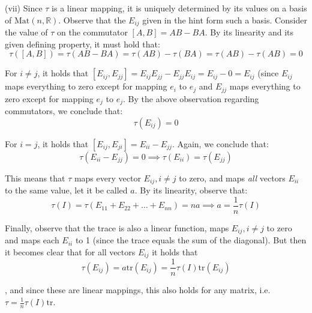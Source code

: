 \begin{solution}
    (vii) Since $\tau$ is a linear mapping, it is uniquely determined by its values on a basis of $\text{Mat}(n, \mathbb{R})$. Observe that the $E_{ij}$ given in the hint form such a basis. Consider the value of $\tau$ on the commutator $[A, B] = AB - BA$. By its linearity and its given defining property, it must hold that:
    $$\tau([A, B]) = \tau(AB-BA) = \tau(AB) - \tau(BA) = \tau(AB) - \tau(AB) = 0$$

    For $i \neq j$, it holds that $[E_{ij}, E_{jj}] = E_{ij}E_{jj} - E_{jj}E_{ij} = E_{ij} - 0 = E_{ij}$ (since $E_{ij}$ maps everything to zero except for mapping $e_i$ to $e_j$ and $E_{jj}$ maps everything to zero except for mapping $e_j$ to $e_j$. By the above observation regarding commutators, we conclude that:
    $$\tau(E_{ij}) = 0$$

    For $i = j$, it holds that $[E_{ij}, E_{ji}] = E_{ii} - E_{jj}$. Again, we conclude that:
    $$\tau(E_{ii} - E_{jj}) = 0 \implies \tau(E_{ii}) = \tau(E_{jj})$$

    This means that $\tau$ maps every vector $E_{ij}, i \neq j$ to zero, and maps \textit{all} vectors $E_{ii}$ to the same value, let it be called $a$. By its linearity, observe that:
    $$\tau(I) = \tau(E_{11}+E_{22} + \ldots + E_{nn}) = na \implies a = \frac{1}{n}\tau(I)$$

    Finally, observe that the trace is also a linear function, maps $E_{ij}, i \neq j$ to zero and maps each $E_{ii}$ to 1 (since the trace equals the sum of the diagonal). But then it becomes clear that for all vectors $E_{ij}$ it holds that 
    $$\tau(E_{ij}) = a \text{tr}(E_{ij}) = \frac{1}{n}\tau(I)\text{tr}(E_{ij})$$

    , and since these are linear mappings, this also holds for any matrix, i.e.\ $\tau = \frac{1}{n}\tau(I)\text{tr}$.
\end{solution}
\newpage
